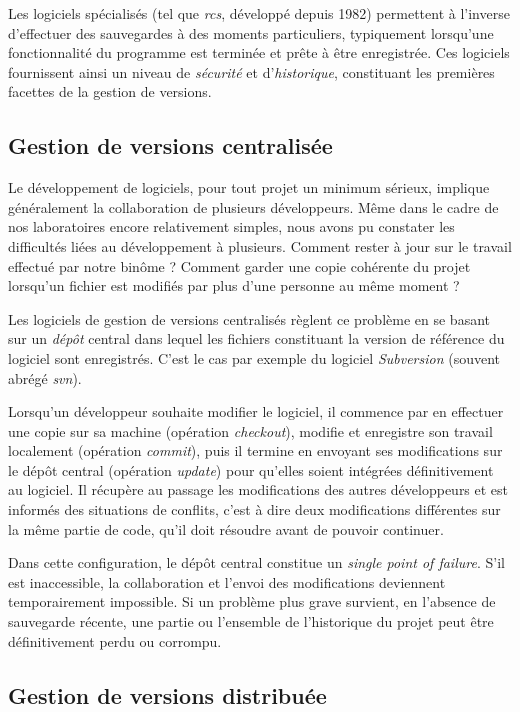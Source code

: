 \documentclass[11pt,a4paper]{article}
\begin{document}
Les logiciels spécialisés (tel que \textit{rcs}, développé depuis 1982) permettent à l'inverse d'effectuer des sauvegardes à des moments particuliers, typiquement lorsqu'une fonctionnalité du programme est terminée et prête à être enregistrée.
Ces logiciels fournissent ainsi un niveau de \textit{sécurité} et d'\textit{historique}, constituant les premières facettes de la gestion de versions.

\subsection{Gestion de versions centralisée}

Le développement de logiciels, pour tout projet un minimum sérieux, implique généralement la collaboration de plusieurs développeurs.
Même dans le cadre de nos laboratoires encore relativement simples, nous avons pu constater les difficultés liées au développement à plusieurs.
Comment rester à jour sur le travail effectué par notre binôme ?
Comment garder une copie cohérente du projet lorsqu'un fichier est modifiés par plus d'une personne au même moment ?

Les logiciels de gestion de versions centralisés règlent ce problème en se basant sur un \textit{dépôt} central dans lequel les fichiers constituant la version de référence du logiciel sont enregistrés.
C'est le cas par exemple du logiciel \textit{Subversion} (souvent abrégé \textit{svn}).

Lorsqu'un développeur souhaite modifier le logiciel, il commence par en effectuer une copie sur sa machine (opération \textit{checkout}), modifie et enregistre son travail localement (opération \textit{commit}), puis il termine en envoyant ses modifications sur le dépôt central (opération \textit{update}) pour qu'elles soient intégrées définitivement au logiciel.
Il récupère au passage les modifications des autres développeurs et est informés des situations de conflits, c'est à dire deux modifications différentes sur la même partie de code, qu'il doit résoudre avant de pouvoir continuer.

Dans cette configuration, le dépôt central constitue un \textit{single point of failure}.
S'il est inaccessible, la collaboration et l'envoi des modifications deviennent temporairement impossible.
Si un problème plus grave survient, en l'absence de sauvegarde récente, une partie ou l'ensemble de l'historique du projet peut être définitivement perdu ou corrompu.

\subsection{Gestion de versions distribuée}
\end{document}
